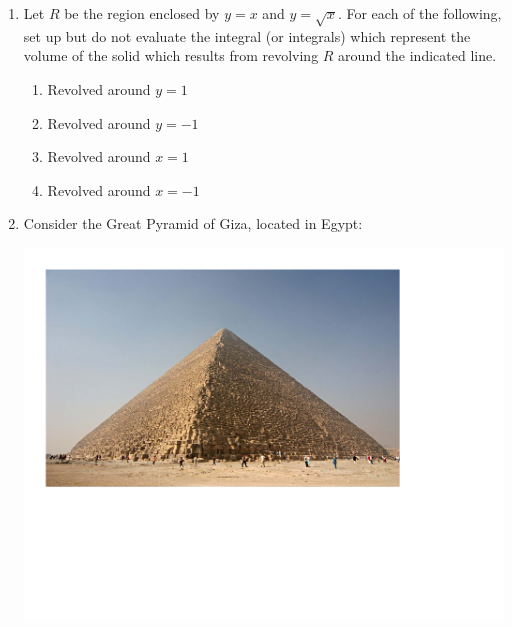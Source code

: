 \documentclass[12pt]{article}
\newif\ifans
\begin{document}
\begin{enumerate}
\begin{enumerate}
\end{enumerate}

\item Let $R$ be the region enclosed by $y=x$ and $y=\sqrt{x}$.  For each of the following, set up but do not evaluate the integral (or integrals) which represent the volume of the solid which results from revolving $R$ around the indicated line.

\begin{enumerate}

\item Revolved around $y=1$

\ifans{\fbox{$\pi \int_0^1 \left((1-x)^2-(1-\sqrt{x})^2\right)\,dx$}} \fi

\item Revolved around $y=-1$

\ifans{\fbox{$\pi \int_0^1 \left((\sqrt{x}+1)^2-(x+1)^2\right)\,dx$}} \fi

\item Revolved around $x=1$

\ifans{\fbox{$\pi \int_0^1 \left((1-y^2)^2-(1-y)^2\right)\,dy$}} \fi

\item Revolved around $x=-1$

\ifans{\fbox{$\pi \int_0^1 \left((1+y)^2-(1+y^2)^2\right)\,dy$}} \fi

\end{enumerate}

\newpage

\item Consider the Great Pyramid of Giza, located in Egypt:

\begin{center}
\includegraphics[scale=0.45]{giza.pdf}
\end{center}


\end{enumerate}
\end{document}
